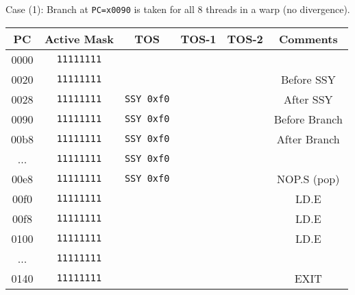 \documentclass[11pt]{article}
\begin{document}
Case (1): Branch at \verb|PC=x0090| is taken for all 8 threads in a warp (no divergence).\\

\begin{table}[H]
	\centering %
	\begin{tabular}{c c c c c c} %
		\hline\hline %
		PC   & Active Mask     & TOS             & TOS-1 & TOS-2 & Comments      \\ [0.5ex] %
		\hline %
		0000 & \verb|11111111| &                 &       &       &               \\
		0020 & \verb|11111111| &                 &       &       & Before SSY    \\
		0028 & \verb|11111111| & \verb|SSY 0xf0| &       &       & After SSY     \\
		0090 & \verb|11111111| & \verb|SSY 0xf0| &       &       & Before Branch \\
		00b8 & \verb|11111111| & \verb|SSY 0xf0| &       &       & After Branch  \\
		...  & \verb|11111111| & \verb|SSY 0xf0| &       &       &               \\
		00e8 & \verb|11111111| & \verb|SSY 0xf0| &       &       & NOP.S (pop)   \\
		00f0 & \verb|11111111| &                 &       &       & LD.E          \\
		00f8 & \verb|11111111| &                 &       &       & LD.E          \\
		0100 & \verb|11111111| &                 &       &       & LD.E          \\
		...  & \verb|11111111| &                 &       &       &               \\
		0140 & \verb|11111111| &                 &       &       & EXIT          \\

		\hline %
	\end{tabular}
	\label{table:nonlin} %
\end{table}
\end{document}
